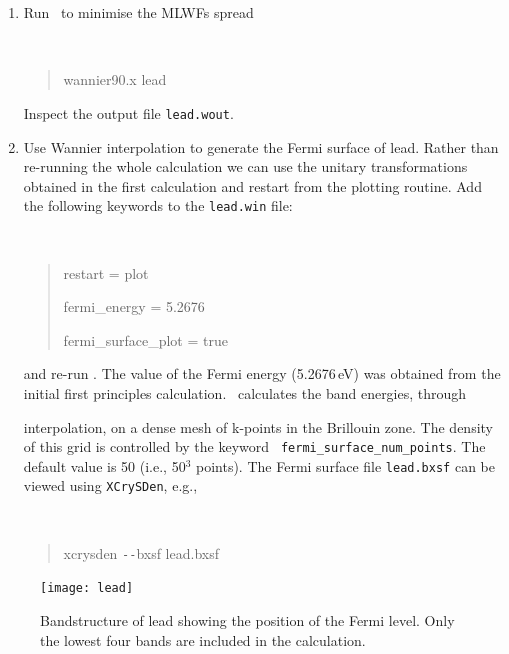\documentclass[a4paper,11pt,twoside]{article}
\begin{document}
\begin{enumerate}
\item Run \wannier\ to minimise the MLWFs spread
{\tt
\begin{quote}
wannier90.x lead
\end{quote} }
Inspect the output file {\tt lead.wout}.
\item Use Wannier interpolation to generate the Fermi surface of
  lead. Rather than re-running the whole calculation we can use the
  unitary transformations obtained in the first calculation and
  restart from the plotting routine. Add the following keywords to the
  {\tt lead.win} file: {\tt
\begin{quote}
restart = plot

fermi\_energy = 5.2676

fermi\_surface\_plot = true
\end{quote} } and re-run \wannier. The value of the Fermi energy
(5.2676\,eV) was obtained from the initial first principles
calculation. \wannier\ calculates the band energies, through 

interpolation, on a dense mesh of k-points in the Brillouin zone. The
density of this grid is controlled by the keyword {\tt
  fermi\_surface\_num\_points}. The default value is 50 (i.e., 50$^3$
points).  The Fermi surface file {\tt lead.bxsf} can be viewed using
{\tt XCrySDen}, e.g., 
%
{\tt
\begin{quote}
xcrysden \texttt{-{}-}bxsf lead.bxsf
\end{quote} }
\end{enumerate}

\begin{figure}[h]
\begin{center}
\texttt{[image: lead]}
\caption{Bandstructure of lead showing the position of the Fermi
  level. Only the lowest four bands are included in the calculation.} 
\label{fig:pb-bnd}
\end{center}
\end{figure}



\end{document}
